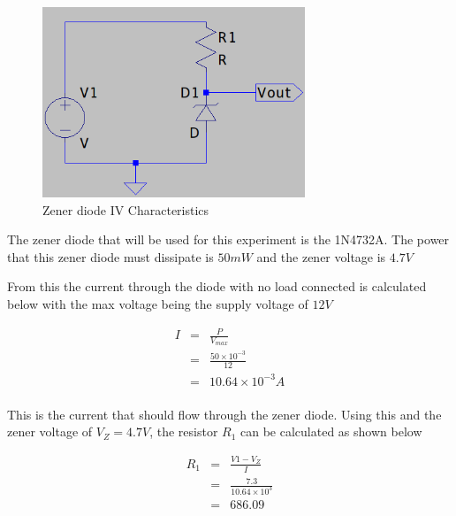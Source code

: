 \documentclass[12pt, a4paper]{article}
\begin{document}
		\begin{figure}[H]
			\centering
			\includegraphics[width=0.7\textwidth]{Images/Regulator_Circuit.png}
			\caption{Zener diode IV Characteristics}
			\label{fig:regulator_circuit}
		\end{figure}

		The zener diode that will be used for this experiment is the 1N4732A. The power that this zener diode must dissipate is $50mW$ and the zener voltage is $4.7V$

		From this the current through the diode with no load connected is calculated below with the max voltage being the supply voltage of $12V$

		\begin{equation}
			\begin{array}{rcl}
				I & = & \frac{P}{V_{max}}\\
				& = & \frac{50\times10^{-3}}{12}\\
				& = & 10.64 \times 10^{-3}A\\
			\end{array}
		  	
		\end{equation}  

		This is the current that should flow through the zener diode. Using this and the zener voltage of $V_Z = 4.7V$, the resistor $R_1$ can be calculated as shown below

		\begin{equation}
			\begin{array}{rcl}
				R_1 & = & \frac{V1 - V_Z}{I}\\
				& = & \frac{7.3}{10.64\times10^{3}}\\
				& = & 686.09
			\end{array}
		  	
		\end{equation}  
\end{document}
